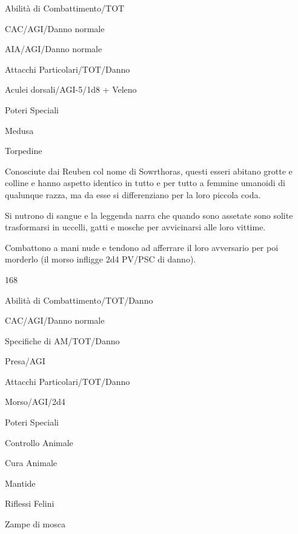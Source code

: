 \begin{parmostro}{Abilit\`a di Combattimento/TOT}
\item CAC/AGI/Danno normale
\item AIA/AGI/Danno normale
\end{parmostro}

\begin{parmostro}{Attacchi Particolari/TOT/Danno}
\item Aculei dorsali/AGI-5/1d8 + Veleno
\end{parmostro}

\begin{parmostro}{Poteri Speciali}
\item Medusa
\item Torpedine
\end{parmostro}


Conosciute dai Reuben col nome di Sowrthoras, questi esseri abitano
grotte e colline e hanno aspetto identico in tutto e per tutto a
femmine umanoidi di qualunque razza, ma da esse si
differenziano per la loro piccola coda.

Si nutrono di sangue e la leggenda narra che quando sono assetate sono
solite trasformarsi in uccelli, gatti e mosche per avvicinarsi alle
loro vittime.

Combattono a mani nude e tendono ad afferrare il loro avversario per
poi morderlo (il morso infligge 2d4 PV/PSC di danno). 

{168}

\begin{parmostro}{Abilit\`a di Combattimento/TOT/Danno}
\item CAC/AGI/Danno normale
\end{parmostro}

\begin{parmostro}{Specifiche di AM/TOT/Danno}
\item Presa/AGI
\end{parmostro}

\begin{parmostro}{Attacchi Particolari/TOT/Danno}
\item Morso/AGI/2d4
\end{parmostro}

\begin{parmostro}{Poteri Speciali}
\item Controllo Animale
\item Cura Animale
\item Mantide
\item Riflessi Felini
\item Zampe di mosca
\end{parmostro}

